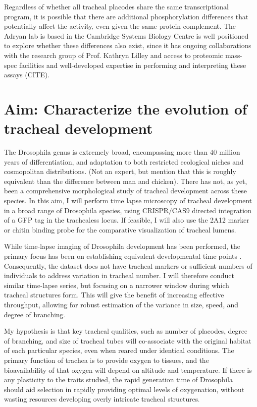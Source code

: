 \documentclass{proposal}
\begin{document}
Regardless of whether all tracheal placodes share the same transcriptional program, it is possible that there are additional phosphorylation differences that potentially affect the activity, even given the same protein complement.
The Adryan lab is based in the Cambridge Systems Biology Centre is well positioned to explore whether these differences also exist, since it has ongoing collaborations with the research group of Prof.  Kathryn Lilley and access to proteomic mass-spec facilities and well-developed expertise in performing and interpreting these assays (CITE).


\section{Aim: Characterize the evolution of tracheal development}

The Drosophila genus is extremely broad, encompassing more than 40 million years of differentiation, and adaptation to both restricted ecological niches and cosmopolitan distributions.
(Not an expert, but mention that this is roughly equivalent than the difference between man and chicken).
There has not, as yet, been a comprehensive morphological study of tracheal development across these species.
In this aim, I will perform time lapse microscopy of tracheal development in a broad range of Drosophila species, using CRISPR/CAS9 directed integration of a GFP tag in the trachealess locus.
If feasible, I will also use the 2A12 marker or chitin binding probe for the comparative visualization of tracheal lumens.  

While time-lapse imaging of Drosophila development has been performed, the primary focus has been on establishing equivalent developmental time points \cite{Kuntz:2014bc}.
Consequently, the dataset does not have tracheal markers or sufficient numbers of individuals to address variation in tracheal number.
I will therefore conduct similar time-lapse series, but focusing on a narrower window during which tracheal structures form.
This will give the benefit of increasing effective throughput, allowing for robust estimation of the variance in size, speed, and degree of branching. 

My hypothesis is that key tracheal qualities, such as number of placodes, degree of branching, and size of tracheal tubes will co-associate with the original habitat of each particular species, even when reared under identical conditions.
The primary function of trachea is to provide oxygen to tissues, and the bioavailability of that oxygen will depend on altitude and temperature.
If there is any plasticity to the traits studied, the rapid generation time of Drosophila should aid selection in rapidly providing optimal levels of oxygenation, without wasting resources developing overly intricate tracheal structures. 
\end{document}
